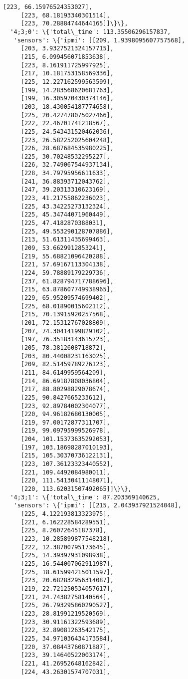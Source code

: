 \documentclass[11pt]{article}
\begin{document}
\begin{tcolorbox}[breakable, size=fbox, boxrule=.5pt, pad at break*=1mm, opacityfill=0]
\begin{Verbatim}[commandchars=\\\{\}]
     [223, 66.15976524353027],
     [223, 68.18193340301514],
     [223, 70.28884744644165]]\}\},
  '4;3;0': \{'total\_time': 113.35506296157837,
   'sensors': \{'ipmi': [[209, 1.9398095607757568],
     [203, 3.9327521324157715],
     [215, 6.099456071853638],
     [223, 8.161911725997925],
     [217, 10.181753158569336],
     [225, 12.227162599563599],
     [199, 14.283568620681763],
     [199, 16.305970430374146],
     [203, 18.430054187774658],
     [225, 20.427478075027466],
     [222, 22.46701741218567],
     [225, 24.543431520462036],
     [223, 26.582252025604248],
     [226, 28.687684535980225],
     [225, 30.70248532295227],
     [226, 32.749067544937134],
     [228, 34.79795956611633],
     [241, 36.88393712043762],
     [247, 39.20313310623169],
     [223, 41.21755862236023],
     [225, 43.34225273132324],
     [225, 45.34744071960449],
     [225, 47.4182870388031],
     [225, 49.553290128707886],
     [213, 51.61311435699463],
     [209, 53.6629912853241],
     [219, 55.68821096420288],
     [221, 57.69167113304138],
     [224, 59.78889179229736],
     [237, 61.828794717788696],
     [215, 63.878607749938965],
     [229, 65.95209574699402],
     [225, 68.01890015602112],
     [215, 70.13915920257568],
     [201, 72.15312767028809],
     [207, 74.30414199829102],
     [197, 76.35183143615723],
     [205, 78.3812608718872],
     [203, 80.44008231163025],
     [209, 82.51459789276123],
     [211, 84.6149959564209],
     [214, 86.69187808036804],
     [217, 88.80298829078674],
     [225, 90.8427665233612],
     [223, 92.89784002304077],
     [220, 94.96182680130005],
     [219, 97.00172877311707],
     [219, 99.09795999526978],
     [204, 101.15373635292053],
     [197, 103.18698287010193],
     [215, 105.30370736122131],
     [223, 107.36123323440552],
     [221, 109.4492084980011],
     [220, 111.54130411148071],
     [220, 113.62031507492065]]\}\},
  '4;3;1': \{'total\_time': 87.203369140625,
   'sensors': \{'ipmi': [[215, 2.043937921524048],
     [225, 4.122193813323975],
     [221, 6.162228584289551],
     [225, 8.26072645187378],
     [223, 10.285899877548218],
     [222, 12.38700795173645],
     [225, 14.39397931098938],
     [225, 16.544007062911987],
     [225, 18.615994215011597],
     [223, 20.682832956314087],
     [219, 22.721250534057617],
     [221, 24.74382758140564],
     [225, 26.793295860290527],
     [223, 28.81991219520569],
     [223, 30.91161322593689],
     [222, 32.89081263542175],
     [225, 34.971036434173584],
     [220, 37.08443760871887],
     [223, 39.14640522003174],
     [221, 41.26952648162842],
     [224, 43.26301574707031],

\end{Verbatim}
\end{tcolorbox}
\end{document}
